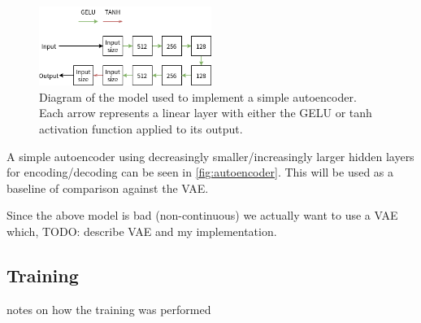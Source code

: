\begin{figure}[h]
\centering
\includegraphics[width=0.5\textwidth]{img/autoencoder}
\caption{Diagram of the model used to implement a simple autoencoder. Each arrow represents a linear layer with either the GELU or tanh activation function applied to its output.}
\label{fig:autoencoder}
\end{figure}

A simple autoencoder using decreasingly smaller/increasingly larger hidden layers for encoding/decoding can be seen in \autoref{fig:autoencoder}. This will be used as a baseline of comparison against the VAE.

Since the above model is bad (non-continuous) we actually want to use a VAE which, TODO: describe VAE and my implementation.

\subsection{Training}\label{subsec:training}
notes on how the training was performed